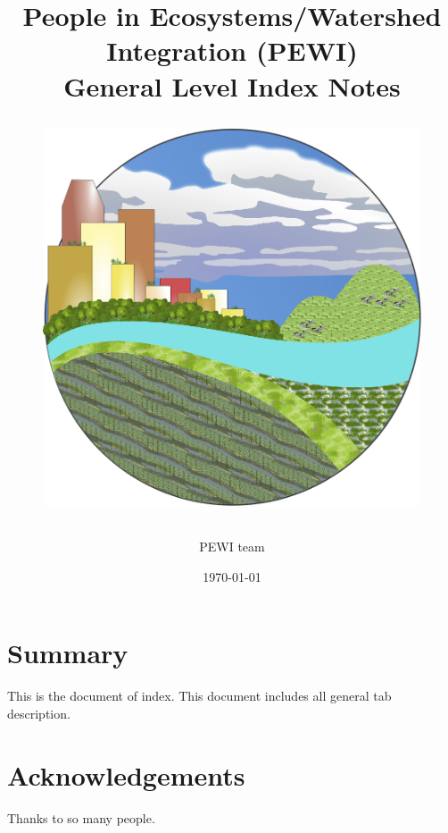 \documentclass[11pt]{article}
\begin{document}
\begin{titlepage}
\title{
	{\large People in Ecosystems/Watershed Integration (PEWI)}\\
	{\huge {General Level Index Notes\\}}
	\begin{figure}[H]
	\centering
	\includegraphics[height=3 in]{../imgs/updatedPewiLogo.png}
	\end{figure}
}
\author{PEWI team}
\date {\today} %
\maketitle
\thispagestyle{empty} %
\end{titlepage}

\section*{Summary}
This is the document of index. This document includes all general tab description.
\cleardoublepage

\section*{Acknowledgements}
Thanks to so many people.
\cleardoublepage


\tableofcontents
\thispagestyle{empty} %
\cleardoublepage %

\setcounter{page}{1}
\end{document}
